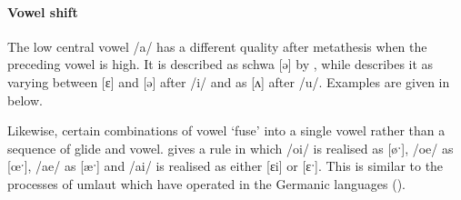 \begin{exe}
	\label{KwaVseq1}
\end{exe}

\paragraph{Vowel shift}\label{sec:KwaVoShi}
The low central vowel /a/ has a different quality
after metathesis when the preceding vowel is high.
It is described as schwa [ə] by \citet[315]{so80},
while \citet[23]{he04} describes it as varying between
[ɛ] and [ə] after /i/ and as [ʌ] after /u/.
Examples are given in  below.

\begin{exe}
	\label{Kw2}
\end{exe}

Likewise, certain combinations of vowel `fuse' into
a single vowel rather than a sequence of glide and vowel.
\citet[316]{so80} gives a rule in which /oi/ is realised as [øˑ],
/oe/ as [œˑ], /ae/ as [æˑ] and /ai/ is realised as either [ɛi] or [ɛˑ].
This is similar to the processes of umlaut which have
operated in the Germanic languages ().


\begin{exe}
	\label{KwVfusionS}
\end{exe}

